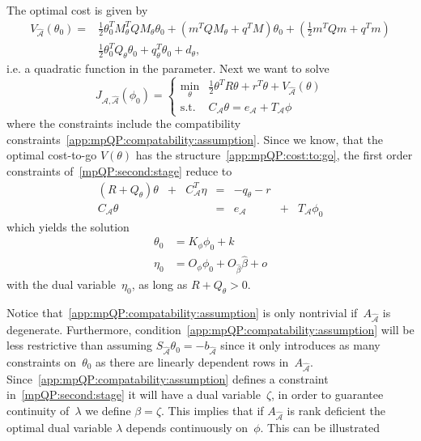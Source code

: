 The optimal cost is given by
%
\begin{equation}\label{app:mpQP:cost:to:go}\begin{split}
	V_{\hat{\mathcal A}}(\theta_0) = &\frac{1}{2}\theta^T_0 M_\theta^T Q M_\theta \theta_0 + \left(m^TQM_\theta + q^TM\right) \theta_0 + 
	\left( \frac{1}{2} m^T Q m + q^T m\right)\\
	&\frac{1}{2} \theta^T_0 Q_\theta \theta_0 + q^T_\theta \theta_0 + d_\theta,
\end{split}\end{equation}
%
i.e. a quadratic function in the parameter.
%
Next we want to solve
%
\begin{equation}\label{mpQP:second:stage}
	J_{\mathcal A,\hat{\mathcal A}}(\phi_0) = \left\{\begin{array}{rl}
	\min_\theta & \frac{1}{2}\theta^TR\theta + r^T\theta + V_{\hat{\mathcal A}}(\theta)\\
	\text{s.t.} & C_{\mathcal A}\theta = e_{\mathcal A} + T_{\mathcal A} \phi
	\end{array}\right.
\end{equation}
%
where the constraints include the compatibility constraints~\eqref{app:mpQP:compatability:assumption}. 
%
Since we know, that the optimal cost-to-go $V(\theta)$ has the structure~\eqref{app:mpQP:cost:to:go},
the first order constraints of~\eqref{mpQP:second:stage} reduce to
%
\begin{equation}\label{mpQP:second:stage:conditions}
	\begin{array}{ccccccc}
		(R + Q_\theta)\theta &+& C^T_{{\mathcal A}}\eta & = & -q_\theta-r && \\
		C_{{\mathcal A}} \theta & & & = & e_{{\mathcal A}}& +& T_{{\mathcal A}}\phi_0
	\end{array}
\end{equation}
%
which yields the solution
%
\begin{equation}
	\begin{split}
	\theta_0 &= K_\phi \phi_0 + k\\
	\eta_0 &= O_\phi \phi_0 + O_{\hat\beta} \hat\beta + o
	\end{split}
\end{equation}
%
with the dual variable~$\eta_0$, as long as $R+Q_\theta>0$.

Notice that~\eqref{app:mpQP:compatability:assumption} is only nontrivial if~$A_{\hat{\mathcal A}}$ is degenerate.
%
Furthermore, condition~\eqref{app:mpQP:compatability:assumption} will be less restrictive than assuming 
$S_{\hat{\mathcal A}}\theta_0=-b_{\hat{\mathcal A}}$ since it only introduces as many constraints on~$\theta_0$ 
as there are linearly dependent rows in~$A_{\hat{\mathcal A}}$.
%
Since~\eqref{app:mpQP:compatability:assumption} defines a constraint in~\eqref{mpQP:second:stage} it will have a dual
variable~$\zeta$, in order to guarantee continuity of~$\lambda$ we define $\beta=\zeta$.
%
This implies that if $A_{\hat{\mathcal A}}$ is rank deficient the optimal dual variable $\lambda$
depends continuously on~$\phi$.
%
This can be illustrated

